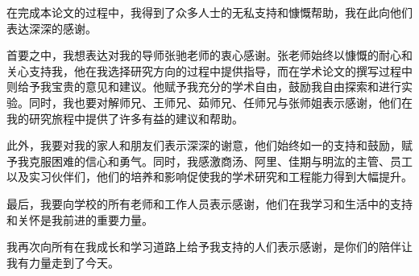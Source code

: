 
\begin{acknowledgements}

在完成本论文的过程中，我得到了众多人士的无私支持和慷慨帮助，我在此向他们表达深深的感谢。

首要之中，我想表达对我的导师张驰老师的衷心感谢。张老师始终以慷慨的耐心和关心支持我，他在我选择研究方向的过程中提供指导，而在学术论文的撰写过程中则给予我宝贵的意见和建议。他赋予我充分的学术自由，鼓励我自由探索和进行实验。同时，我也要对解师兄、王师兄、茹师兄、任师兄与张师姐表示感谢，他们在我的研究旅程中提供了许多有益的建议和帮助。

此外，我要对我的家人和朋友们表示深深的谢意，他们始终如一的支持和鼓励，赋予我克服困难的信心和勇气。同时，我感激商汤、阿里、佳期与明汯的主管、员工以及实习伙伴们，他们的培养和影响促使我的学术研究和工程能力得到大幅提升。

最后，我要向学校的所有老师和工作人员表示感谢，他们在我学习和生活中的支持和关怀是我前进的重要力量。

我再次向所有在我成长和学习道路上给予我支持的人们表示感谢，是你们的陪伴让我有力量走到了今天。

\end{acknowledgements}
